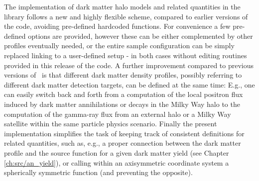The implementation of dark matter halo models and related quantities in the library 
 follows a new and highly flexible scheme, compared to earlier versions of the code,
avoiding pre-defined hardcoded functions. 
For convenience a few pre-defined options are provided, however these can be either complemented by other profiles
eventually needed, or the entire sample configuration can be simply replaced linking to a user-defined setup 
- in both cases without editing routines provided in this release of the code. 
A further improvement compared to previous versions of \ds\ is that different dark matter density profiles, possibly referring to 
different dark matter detection targets, can be defined at the same time: E.g., one can easily
switch back and forth from a computation of the local positron flux induced by dark matter annihilations or decays in the
Milky Way halo to the computation of the gamma-ray flux from an external halo or a Milky Way satellite within the same   
particle physics scenario. Finally the present implementation simplifies the task of keeping track of consistent definitions 
for related quantities, such as, e.g., a proper connection between the dark matter profile and the source function 
for a given dark matter yield (see Chapter \ref{ch:src/an_yield}), or calling within an axisymmetric coordinate system a spherically symmetric function 
(and preventing the opposite). 

